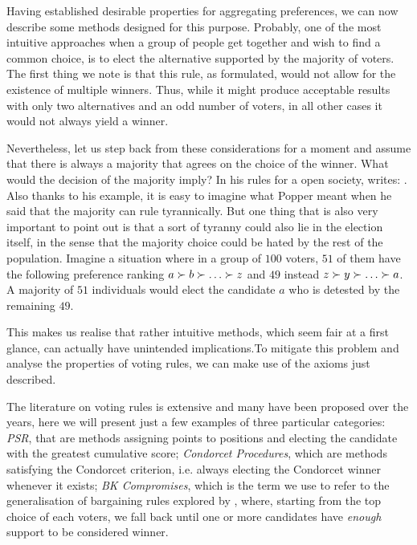 Having established desirable properties for aggregating preferences, we can now describe some methods designed for this purpose.
Probably, one of the most intuitive approaches when a group of people get together and wish to find a common choice, is to elect the alternative supported by the majority of voters. The first thing we note is that this rule, as formulated, would not allow for the existence of multiple winners. Thus, while it might produce acceptable results with only two alternatives and an odd number of voters, in all other cases it would not always yield a winner.

Nevertheless, let us step back from these considerations for a moment and assume that there is always a majority that agrees on the choice of the winner. What would the decision of the majority imply?
In his rules for a open society, \citet[vol. 2, ch. 19]{Popper1945} writes:
\textit{}.
Also thanks to his example, it is easy to imagine what Popper meant when he said that the majority can rule tyrannically.
But one thing that is also very important to point out is that a sort of tyranny could also lie in the election itself, in the sense that the majority choice could be hated by the rest of the population.
Imagine a situation where in a group of $100$ voters, $51$ of them have the following preference ranking $a\pref b \pref \dots \pref z$ and $49$ instead $z \pref y \pref \dots \pref a$. A majority of $51$ individuals would elect the candidate $a$ who is detested by the remaining $49$.

This makes us realise that rather intuitive methods, which seem fair at a first glance, can actually have unintended implications.To mitigate this problem and analyse the properties of voting rules, we can make use of the axioms just described.

The literature on voting rules is extensive and many have been proposed over the years, here we will present just a few examples of three particular categories: \textit{\acl{PSR}}, that are methods assigning points to positions and electing the candidate with the greatest cumulative score; \textit{Condorcet Procedures}, which are methods satisfying the Condorcet criterion, i.e. always electing the Condorcet winner whenever it exists; \textit{BK Compromises}, which is the term we use to refer to the generalisation of bargaining rules explored by \citet{Brams2001}, where, starting from the top choice of each voters, we fall back until one or more candidates have \textit{enough} support to be considered winner.

